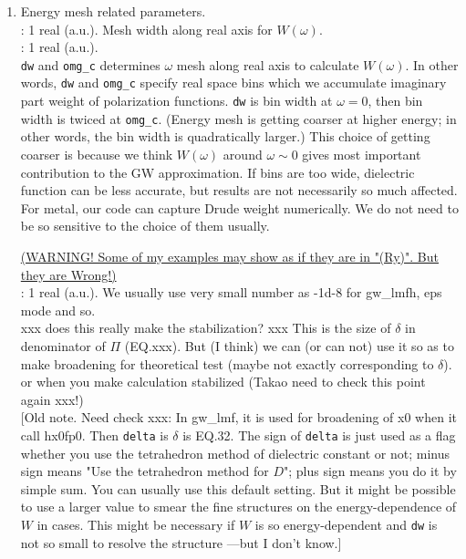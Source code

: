 {\begin{enumerate}
\item 
Energy mesh related parameters.\\
     : 1 real (a.u.). Mesh width along real axis for $W(\omega)$.\\
 : 1 real (a.u.). \\
{\tt dw} and {\tt omg\_c}
determines $\omega$ mesh along real axis to calculate $W(\omega)$.
In other words, \verb+dw+ and \verb+omg_c+ specify real 
space bins which we accumulate imaginary part
weight of polarization functions. \verb+dw+ is bin width at
$\omega=0$, then bin width is twiced at \verb+omg_c+.
(Energy mesh is getting coarser at higher energy; in other words, 
the bin width is quadratically larger.)
This choice of getting coarser is because we think $W(\omega)$
around $\omega \sim 0$ gives most important contribution to the GW approximation.
If bins are too wide, dielectric function can be less accurate, 
but results are not necessarily so much affected. 
For metal, our code can capture Drude weight
numerically. We do not need to be so sensitive to the choice of
them usually.


\underline{(WARNING! Some of my examples may show as if they are in "(Ry)". But they are Wrong!)}\\


\vspace{2mm}
: 1 real (a.u.). We usually use very small number as -1d-8
for gw\_lmfh, eps mode and so.\\
xxx does this really make the stabilization? xxx
This is the size of $\delta$ in denominator of $\Pi$ (EQ.xxx).
But (I think) we can (or can not) use it so as to make broadening 
for theoretical test (maybe not exactly corresponding to $\delta$).
or when you make calculation stabilized 
(Takao need to check this point again xxx!) \\

[Old note. Need check xxx:
In gw\_lmf, it is used for broadening of x0 when it call hx0fp0.
Then {\tt delta} is $\delta$ is EQ.32.
The sign of {\tt delta} is just used as a flag whether you use the
tetrahedron method of dielectric constant \cite{rath75} or not; minus sign means
"Use the tetrahedron method for $D$"; plus sign means you do it by simple sum.
You can usually use this default setting. But it might be possible
to use a larger value to smear the fine structures
on the energy-dependence of $W$ in cases.
This might be necessary if $W$ is so energy-dependent 
and \verb#dw# is not so small to resolve the structure
---but I don't know.]\\



\end{enumerate}}
